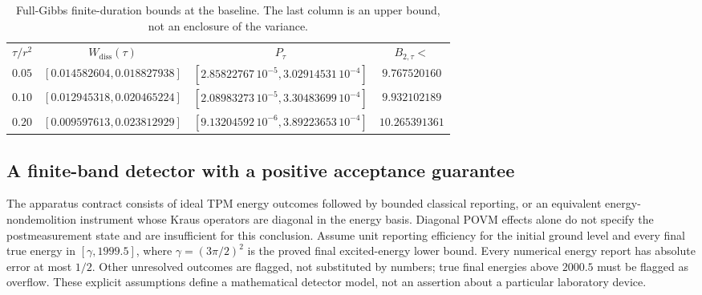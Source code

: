 \documentclass[aps,pra,reprint,superscriptaddress,longbibliography]{revtex4-2}
\newcommand{\Wd}{W_{\mathrm{diss}}}
\begin{document}
\begin{table}[t]
\caption{Full-Gibbs finite-duration bounds at the baseline.
The last column is an upper bound, not an enclosure of the variance.}
\label{tab:nc-finite-time}
\begin{ruledtabular}
\begin{tabular}{cccc}
$\tau/r^2$&$\Wd(\tau)$&$P_\tau$&$B_{2,\tau}<$\\
$0.05$&$[0.014582604,0.018827938]$
 &$[2.85822767\,10^{-5},3.02914531\,10^{-4}]$&$9.767520160$\\
$0.10$&$[0.012945318,0.020465224]$
 &$[2.08983273\,10^{-5},3.30483699\,10^{-4}]$&$9.932102189$\\
$0.20$&$[0.009597613,0.023812929]$
 &$[9.13204592\,10^{-6},3.89223653\,10^{-4}]$&$10.265391361$
\end{tabular}
\end{ruledtabular}
\end{table}

\subsection{A finite-band detector with a positive acceptance guarantee}

The apparatus contract consists of ideal TPM energy outcomes followed
by bounded classical reporting, or an equivalent energy-nondemolition
instrument whose Kraus operators are diagonal in the energy basis.
Diagonal POVM effects alone do not specify the postmeasurement state
and are insufficient for this conclusion.  Assume unit reporting
efficiency for the initial ground level and every final true energy in
$[\gamma,1999.5]$, where $\gamma=(3\pi/2)^2$ is the proved
final excited-energy lower bound.  Every numerical energy report has
absolute error at most $1/2$.  Other unresolved outcomes are flagged,
not substituted by numbers; true final energies above $2000.5$ must be
flagged as overflow.  These explicit assumptions define a mathematical
detector model, not an assertion about a particular laboratory device.
\end{document}
